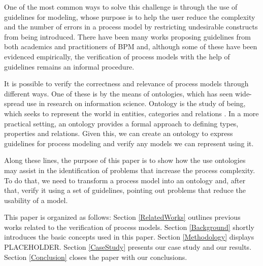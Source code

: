 \documentclass{llncs}
\begin{document}
One of the most common ways to solve this challenge is through the use of guidelines for modeling, whose purpose is to help the user reduce the complexity and the number of errors in a process model by restricting undesirable constructs from being introduced. There have been many works proposing guidelines from both academics \cite{Mendling and Others} and practitioners of BPM \cite{Silver and Others} and, although some of these have been evidenced empirically, the verification of process models with the help of guidelines remains an informal procedure.


It is possible to verify the correctness and relevance of process models through different ways. One of these is by the means of ontologies, which has seen wide-spread use in research on information science. Ontology is the study of being, which seeks to represent the world in entities, categories and relations \cite{Mendling2008}. In a more practical setting, an ontology provides a formal approach to defining types, properties and relations. Given this, we can create an ontology to express guidelines for process modeling and verify any models we can represent using it.


Along these lines, the purpose of this paper is to show how the use ontologies may assist in the identification of problems that increase the process complexity. To do that, we need to transform a process model into an ontology and, after that, verify it using a set of guidelines, pointing out problems that reduce the usability of a model.


This paper is organized as follows: Section \ref{RelatedWorks} outlines previous works related to the verification of process models. Section \ref{Background} shortly introduces the basic concepts used in this paper. Section \ref{Methodology} displays PLACEHOLDER. Section \ref{CaseStudy} presents our case study and our results. Section \ref{Conclusion} closes the paper with our conclusions.
\end{document}
